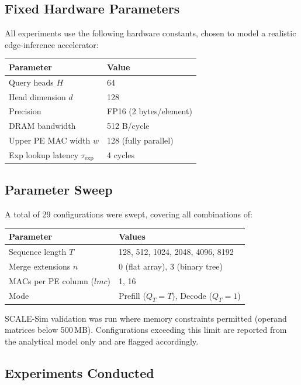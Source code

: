 \documentclass[11pt]{article}
\begin{document}
\subsection{Fixed Hardware Parameters}

All experiments use the following hardware constants,
chosen to model a realistic edge-inference accelerator:

\begin{center}
\begin{tabular}{ll}
\toprule
Parameter & Value \\
\midrule
Query heads \(H\) & 64 \\
Head dimension \(d\) & 128 \\
Precision & FP16 (2 bytes/element) \\
DRAM bandwidth & 512 B/cycle \\
Upper PE MAC width \(w\) & 128 (fully parallel) \\
Exp lookup latency \(\tau_{\exp}\) & 4 cycles \\
\bottomrule
\end{tabular}
\end{center}

\subsection{Parameter Sweep}

A total of 29 configurations were swept, covering all
combinations of:

\begin{center}
\begin{tabular}{ll}
\toprule
Parameter & Values \\
\midrule
Sequence length \(T\) & 128, 512, 1024, 2048, 4096, 8192 \\
Merge extensions \(n\) & 0 (flat array), 3 (binary tree) \\
MACs per PE column (\(lmc\)) & 1, 16 \\
Mode & Prefill (\(Q_T = T\)), Decode (\(Q_T = 1\)) \\
\bottomrule
\end{tabular}
\end{center}

SCALE-Sim validation was run where memory constraints
permitted (operand matrices below 500\,MB).
Configurations exceeding this limit are reported from the
analytical model only and are flagged accordingly.

\subsection{Experiments Conducted}
\end{document}
